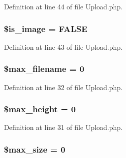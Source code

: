 Definition at line 44 of file Upload.\-php.

\hypertarget{class_c_i___upload_a4dae8ae20ed5fdf406554e1911065753}{
\subsubsection[{\$is\-\_\-image}]{\setlength{\rightskip}{0pt plus 5cm}\${\bf is\-\_\-image} = F\-A\-L\-S\-E}}\label{class_c_i___upload_a4dae8ae20ed5fdf406554e1911065753}


Definition at line 43 of file Upload.\-php.

\hypertarget{class_c_i___upload_a7c8c80e453111c2521e355b83331a9df}{
\subsubsection[{\$max\-\_\-filename}]{\setlength{\rightskip}{0pt plus 5cm}\$max\-\_\-filename = 0}}\label{class_c_i___upload_a7c8c80e453111c2521e355b83331a9df}


Definition at line 32 of file Upload.\-php.

\hypertarget{class_c_i___upload_a7f2b56fde8cdd8907f9228149fc4b9bc}{
\subsubsection[{\$max\-\_\-height}]{\setlength{\rightskip}{0pt plus 5cm}\$max\-\_\-height = 0}}\label{class_c_i___upload_a7f2b56fde8cdd8907f9228149fc4b9bc}


Definition at line 31 of file Upload.\-php.

\hypertarget{class_c_i___upload_a3fec414be9f76cb7ba77ed79b784de62}{
\subsubsection[{\$max\-\_\-size}]{\setlength{\rightskip}{0pt plus 5cm}\$max\-\_\-size = 0}}\label{class_c_i___upload_a3fec414be9f76cb7ba77ed79b784de62}


